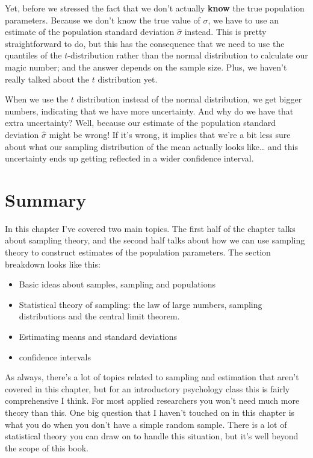 \documentclass[]{book}
\begin{document}
Yet, before we stressed the fact that we don't actually \textbf{know} the true population parameters. Because we don't know the true value of \(\sigma\), we have to use an estimate of the population standard deviation \(\hat{\sigma}\) instead. This is pretty straightforward to do, but this has the consequence that we need to use the quantiles of the \(t\)-distribution rather than the normal distribution to calculate our magic number; and the answer depends on the sample size. Plus, we haven't really talked about the \(t\) distribution yet.

When we use the \(t\) distribution instead of the normal distribution, we get bigger numbers, indicating that we have more uncertainty. And why do we have that extra uncertainty? Well, because our estimate of the population standard deviation \(\hat\sigma\) might be wrong! If it's wrong, it implies that we're a bit less sure about what our sampling distribution of the mean actually looks like\ldots{} and this uncertainty ends up getting reflected in a wider confidence interval.

\hypertarget{summary}{%
\section{Summary}\label{summary}}

In this chapter I've covered two main topics. The first half of the chapter talks about sampling theory, and the second half talks about how we can use sampling theory to construct estimates of the population parameters. The section breakdown looks like this:

\begin{itemize}
\item
  Basic ideas about samples, sampling and populations
\item
  Statistical theory of sampling: the law of large numbers, sampling distributions and the central limit theorem.
\item
  Estimating means and standard deviations
\item
  confidence intervals
\end{itemize}

As always, there's a lot of topics related to sampling and estimation that aren't covered in this chapter, but for an introductory psychology class this is fairly comprehensive I think. For most applied researchers you won't need much more theory than this. One big question that I haven't touched on in this chapter is what you do when you don't have a simple random sample. There is a lot of statistical theory you can draw on to handle this situation, but it's well beyond the scope of this book.
\end{document}
